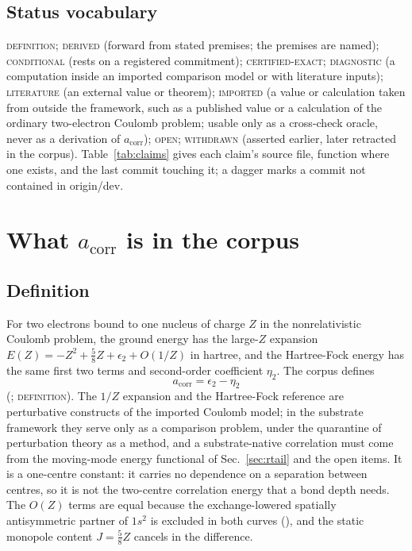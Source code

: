 \documentclass[aps,prd,onecolumn,amsmath,amssymb,longbibliography,floatfix,nofootinbib]{revtex4-2}
\newcommand{\acorr}{a_{\mathrm{corr}}}
\newcommand{\st}[1]{\textsc{#1}}
\begin{document}
\subsection{Status vocabulary}
\st{definition}; \st{derived} (forward from stated premises; the premises are named); \st{conditional} (rests on a registered commitment); \st{certified-exact}; \st{diagnostic} (a computation inside an imported comparison model or with literature inputs); \st{literature} (an external value or theorem); \st{imported} (a value or calculation taken from outside the framework, such as a published value or a calculation of the ordinary two-electron Coulomb problem; usable only as a cross-check oracle, never as a derivation of $\acorr$); \st{open}; \st{withdrawn} (asserted earlier, later retracted in the corpus). Table~\ref{tab:claims} gives each claim's source file, function where one exists, and the last commit touching it; a dagger marks a commit not contained in origin/dev.

\section{What \texorpdfstring{$a_{\mathrm{corr}}$}{a_corr} is in the corpus}

\subsection{Definition}
For two electrons bound to one nucleus of charge $Z$ in the nonrelativistic Coulomb problem, the ground energy has the large-$Z$ expansion $E(Z)=-Z^2+\tfrac58Z+\epsilon_2+O(1/Z)$ in hartree, and the Hartree-Fock energy has the same first two terms and second-order coefficient $\eta_2$. The corpus defines
\begin{equation}
\acorr=\epsilon_2-\eta_2
\end{equation}
(; \st{definition}). The $1/Z$ expansion and the Hartree-Fock reference are perturbative constructs of the imported Coulomb model; in the substrate framework they serve only as a comparison problem, under the quarantine of perturbation theory as a method, and a substrate-native correlation must come from the moving-mode energy functional of Sec.~\ref{sec:rtail} and the open items. It is a one-centre constant: it carries no dependence on a separation between centres, so it is not the two-centre correlation energy that a bond depth needs. The $O(Z)$ terms are equal because the exchange-lowered spatially antisymmetric partner of $1s^2$ is excluded in both curves (), and the static monopole content $J=\tfrac58Z$ cancels in the difference.
\end{document}
